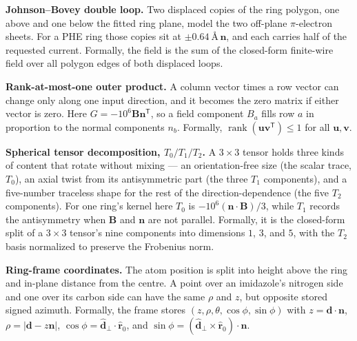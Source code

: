 \documentclass[11pt]{article}
\begin{document}
\textbf{Johnson--Bovey double loop.} Two displaced copies of the ring polygon,
one above and one below the fitted ring plane, model the two off-plane
\(\pi\)-electron sheets. For a PHE ring those copies sit at
\(\pm\SI{0.64}{\angstrom}\,\bm n\), and each carries half of the requested
current. Formally, the field is the sum of the closed-form finite-wire field
over all polygon edges of both displaced loops.

\textbf{Rank-at-most-one outer product.} A column vector times a row vector can
change only along one input direction, and it becomes the zero matrix if either
vector is zero. Here \(G=-10^6\bm B\bm n^{\mathsf T}\), so a field component
\(B_a\) fills row \(a\) in proportion to the normal components \(n_b\).
Formally, \(\operatorname{rank}(\bm u\bm v^{\mathsf T})\le 1\) for all
\(\bm u,\bm v\).

\textbf{Spherical tensor decomposition, \(T_0/T_1/T_2\).} A \(3\times3\)
tensor holds three kinds of content that rotate without mixing --- an
orientation-free size (the scalar trace, \(T_0\)), an axial twist from its
antisymmetric part (the three \(T_1\) components), and a five-number traceless
shape for the rest of the direction-dependence (the five \(T_2\) components).
For one ring's kernel here \(T_0\) is
\(-10^6(\bm n\cdot\bm B)/3\), while \(T_1\) records the antisymmetry when
\(\bm B\) and \(\bm n\) are not parallel. Formally, it is the closed-form split
of a \(3\times3\) tensor's nine components into dimensions \(1\), \(3\), and
\(5\), with the \(T_2\) basis normalized to preserve the Frobenius norm.

\textbf{Ring-frame coordinates.} The atom position is split into height above
the ring and in-plane distance from the centre. A point over an imidazole's
nitrogen side and one over its carbon side can have the same \(\rho\) and \(z\),
but opposite stored signed azimuth. Formally, the frame stores
\((z,\rho,\theta,\cos\phi,\sin\phi)\) with \(z=\bm d\cdot\bm n\),
\(\rho=|\bm d-z\bm n|\), \(\cos\phi=\hat{\bm d}_\perp\cdot\hat{\bm r}_0\), and
\(\sin\phi=(\hat{\bm d}_\perp\times\hat{\bm r}_0)\cdot\bm n\).
\end{document}
